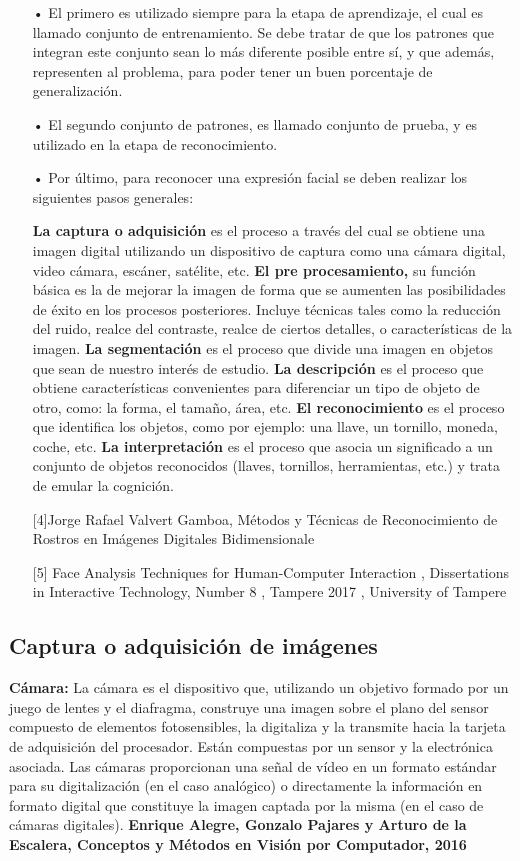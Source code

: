 \begin{itemize}
\item[•] El primero es utilizado siempre para la etapa de aprendizaje, el cual es llamado conjunto de entrenamiento. Se debe tratar de que los patrones que integran este conjunto sean lo más diferente posible entre sí, y que además, representen al problema, para poder tener un buen porcentaje de generalización.
\item[•] El segundo conjunto de patrones, es llamado conjunto de prueba, y es utilizado en la etapa de reconocimiento.
\item[•] Por último, para reconocer una expresión facial se deben realizar los siguientes pasos generales: \vskip 0.1cm

{\bf La captura o adquisición} es el proceso a través del cual se obtiene una imagen digital utilizando un dispositivo de captura como una cámara digital, video cámara, escáner, satélite, etc.
\vskip 0.1cm
{\bf El pre procesamiento,} su función básica es la de mejorar la imagen de forma que se aumenten las posibilidades de éxito en los procesos posteriores. Incluye técnicas tales como la reducción del ruido, realce del contraste, realce de ciertos detalles, o características de la imagen. 
\vskip 0.1cm
{\bf La segmentación} es el proceso que divide una imagen en objetos que sean de nuestro interés de estudio. 
\vskip 0.1cm
{\bf La descripción} es el proceso que obtiene características convenientes para diferenciar un tipo de objeto de otro, como: la forma, el tamaño, área, etc.
\vskip 0.1cm
{\bf El reconocimiento} es el proceso que identifica los objetos, como por ejemplo: una llave, un tornillo, moneda, coche, etc.
\vskip 0.1cm
{\bf La interpretación} es el proceso que asocia un significado a un conjunto de objetos reconocidos (llaves, tornillos, herramientas, etc.) y trata de emular la cognición.

[4]Jorge Rafael Valvert Gamboa, Métodos y Técnicas de Reconocimiento de Rostros en Imágenes Digitales Bidimensionale

[5] Face Analysis Techniques for Human-Computer Interaction , Dissertations in Interactive Technology, Number 8 , Tampere 2017 , University of Tampere 
 
\end{itemize}

\subsection{Captura o adquisición de imágenes}
{\bf Cámara:} \vskip 0.1cm
La cámara es el dispositivo que, utilizando un objetivo formado por un juego de lentes y el diafragma, construye una imagen sobre el plano del sensor compuesto de elementos fotosensibles, la digitaliza y la transmite hacia la tarjeta de adquisición del procesador. Están compuestas por un sensor y la electrónica asociada. Las cámaras proporcionan una señal de vídeo en un formato estándar para su digitalización (en el caso analógico) o directamente la información en formato digital que constituye la imagen captada por la misma (en el caso de cámaras digitales).
\vskip 0.1cm
{\bf Enrique Alegre, Gonzalo Pajares y Arturo de la Escalera, Conceptos y Métodos en Visión por Computador, 2016}

